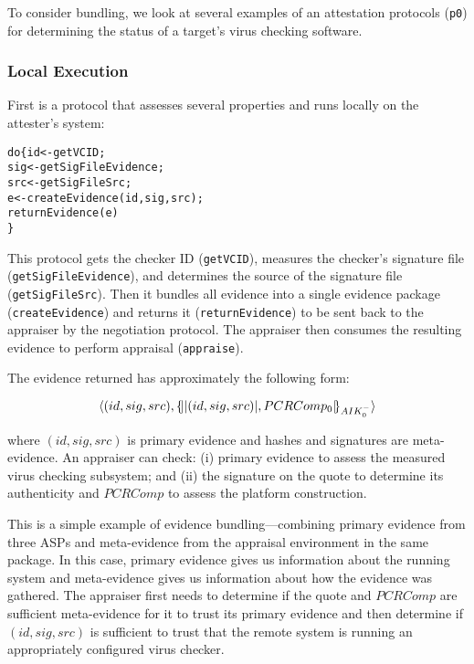 \documentclass[10pt]{article}
\begin{document}
To consider bundling, we look at several examples of an attestation
protocols (\Verb+p0+) for determining the status of a target's virus
checking software.

\subsubsection*{Local Execution}

First is a protocol that assesses several properties and runs locally
on the attester's system:

\begin{alltt}
  do \{ id <- getVCID;
       sig <- getSigFileEvidence;
       src <- getSigFileSrc;
       e <- createEvidence(id,sig,src);
       returnEvidence(e)
  \}
\end{alltt}

This protocol gets the checker ID (\Verb+getVCID+), measures the
checker's signature file (\Verb+getSigFileEvidence+), and determines
the source of the signature file (\Verb+getSigFileSrc+). Then it
bundles all evidence into a single evidence package
(\Verb+createEvidence+) and returns it (\Verb+returnEvidence+) to be
sent back to the appraiser by the negotiation protocol.  The appraiser
then consumes the resulting evidence to perform appraisal
(\Verb+appraise+).

The evidence returned has approximately the following form:

\[\langle (id,sig,src),\{\!\lvert \lvert (id,sig,src) \rvert,PCRComp_0\rvert\!\}_{AIK_0^{-}}\rangle\]

where $(id,sig,src)$ is primary evidence and hashes and signatures are
meta-evidence.  An appraiser can check: (i) primary evidence to assess
the measured virus checking subsystem; and (ii) the signature on the
quote to determine its authenticity and $PCRComp$ to assess the
platform construction.

This is a simple example of evidence bundling---combining primary
evidence from three ASPs and meta-evidence from the appraisal
environment in the same package.  In this case, primary evidence gives
us information about the running system and meta-evidence gives us
information about how the evidence was gathered.  The appraiser first
needs to determine if the quote and $PCRComp$ are sufficient
meta-evidence for it to trust its primary evidence and then determine
if $(id,sig,src)$ is sufficient to trust that the remote system is
running an appropriately configured virus checker.

\end{document}
